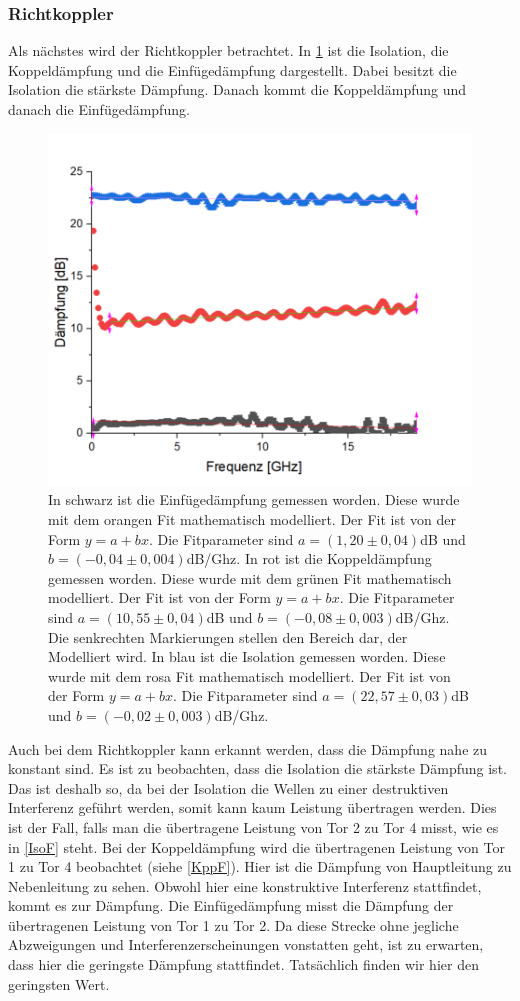 \subsubsection{Richtkoppler}
Als nächstes wird der Richtkoppler betrachtet. In \cref{Richt} ist die Isolation, die Koppeldämpfung und die Einfügedämpfung dargestellt. Dabei besitzt die Isolation die stärkste Dämpfung. Danach kommt die Koppeldämpfung und danach die Einfügedämpfung.
\begin{figure}[h!]
	\centering
	\includegraphics[scale = 1]{Richtkoppler11.png}
	\caption{In schwarz ist die Einfügedämpfung gemessen worden. Diese wurde mit dem orangen Fit mathematisch modelliert. Der Fit ist von der Form $y = a + bx$. Die Fitparameter sind $a = (1,20 \pm 0,04)$dB und $b = (-0,04 \pm 0,004)$dB/Ghz.
	In rot ist die Koppeldämpfung gemessen worden. Diese wurde mit dem grünen Fit mathematisch modelliert. Der Fit ist von der Form $y = a + bx$. Die Fitparameter sind $a = (10,55 \pm 0,04)$dB und $b = (-0,08 \pm 0,003)$dB/Ghz. Die senkrechten Markierungen stellen den Bereich dar, der Modelliert wird.
	In blau ist die Isolation gemessen worden. Diese wurde mit dem rosa Fit mathematisch modelliert. Der Fit ist von der Form $y = a + bx$. Die Fitparameter sind $a = (22,57 \pm 0,03)$dB und $b = (-0,02 \pm 0,003)$dB/Ghz.}
	\label{Richt}
\end{figure}
Auch bei dem Richtkoppler kann erkannt werden, dass die Dämpfung nahe zu konstant sind. Es ist zu beobachten, dass die Isolation die stärkste Dämpfung ist. Das ist deshalb so, da bei der Isolation die Wellen zu einer destruktiven Interferenz geführt werden, somit kann kaum Leistung übertragen werden. Dies ist der Fall, falls man die übertragene Leistung von Tor 2 zu Tor 4 misst, wie es in \cref{IsoF} steht.  Bei der Koppeldämpfung wird  die übertragenen Leistung von Tor 1 zu Tor 4 beobachtet (siehe \cref{KppF}). Hier ist die Dämpfung von Hauptleitung zu Nebenleitung zu sehen. Obwohl hier eine konstruktive Interferenz stattfindet, kommt es zur Dämpfung. Die Einfügedämpfung misst die Dämpfung der übertragenen Leistung von Tor 1 zu Tor 2. Da diese Strecke ohne jegliche Abzweigungen und Interferenzerscheinungen vonstatten geht, ist zu erwarten, dass hier die geringste Dämpfung stattfindet. Tatsächlich finden wir hier den geringsten Wert.

